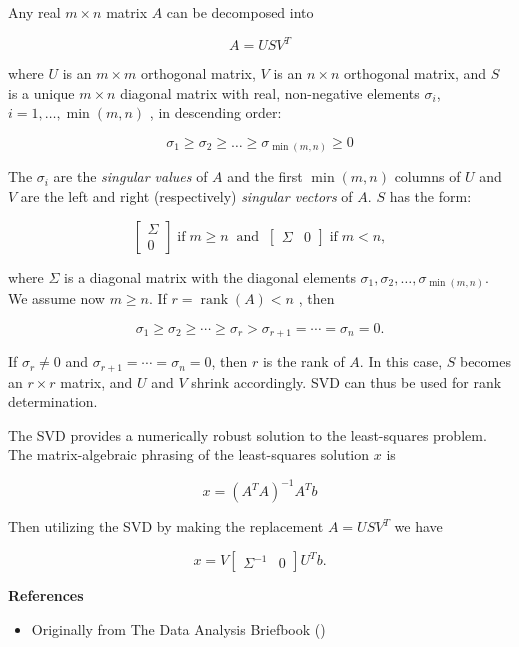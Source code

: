 \documentclass[12pt]{article}
\begin{document}
Any real $m \times n$ matrix $A$ can be decomposed into

$$ A = USV^T $$

where $U$ is an $m \times m$ orthogonal matrix, $V$ is an $n \times n$ orthogonal matrix, and $S$ is a unique $m \times n$ diagonal matrix with real, non-negative elements $\sigma_i$, $i = 1, \ldots , \min(m,n)$ , in descending order:

$$ \sigma_1 \ge \sigma_2 \ge \dots \ge \sigma_{\min(m,n)} \ge 0 $$

The $\sigma_i$ are the \emph{singular values} of $A$ and the first $\min(m,n)$ columns of $U$ and $V$ are the left and right (respectively) \emph{singular vectors} of $A$.  $S$ has the form:

$$ \begin{bmatrix}\Sigma \\ 0\end{bmatrix} \operatorname{if} m \ge n \;\operatorname{and}\; \begin{bmatrix}\Sigma & 0 \end{bmatrix} \operatorname{if} m < n,$$

where $\Sigma$ is a diagonal matrix with the diagonal elements $\sigma_1,\sigma_2,\ldots , \sigma_{\min(m,n)}$.  We assume now $m \ge n$. If $r=\operatorname{rank}(A) < n $ , then

$$ \sigma_1 \ge \sigma_2 \ge \cdots \ge \sigma_r > \sigma_{r+1} = \cdots = \sigma_n = 0.$$

If $\sigma_r \ne 0$ and $\sigma_{r+1} = \cdots = \sigma_n = 0$, then $r$ is the rank of $A$.  In this case, $S$ becomes an $r \times r$ matrix, and $U$ and $V$ shrink accordingly.  SVD can thus be used for rank determination.

The SVD provides a numerically robust solution to the least-squares problem.  The matrix-algebraic phrasing of the least-squares solution $x$ is 

$$ x = (A^T A)^{-1} A^T b $$

Then utilizing the SVD by making the replacement $A=USV^T$ we have

$$ x = V \begin{bmatrix} \Sigma^{-1} & 0 \end{bmatrix} U^T b .$$

{\bf References}

\begin{itemize}
\item Originally from The Data Analysis Briefbook ()
\end{itemize}
\end{document}
